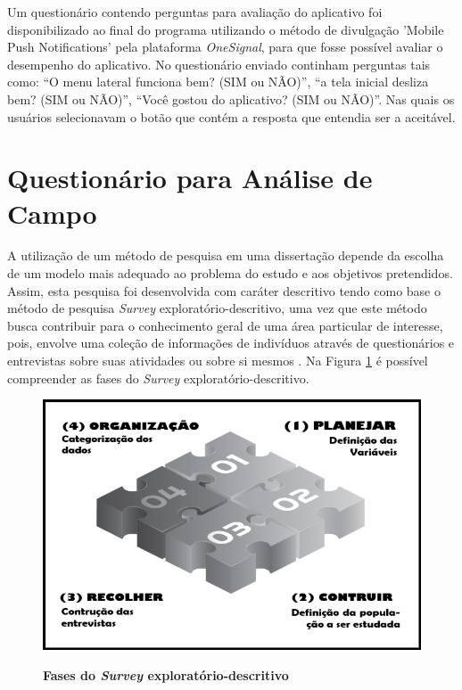 Um questionário contendo perguntas para avaliação do aplicativo foi disponibilizado ao final do programa utilizando o método de divulgação 'Mobile Push Notifications' pela plataforma \textit{OneSignal}, para que fosse possível avaliar o desempenho do aplicativo. No questionário enviado continham perguntas tais como: “O menu lateral funciona bem? (SIM ou NÃO)”, “a tela inicial desliza bem? (SIM ou NÃO)”, “Você gostou do aplicativo? (SIM ou NÃO)”. Nas quais os usuários selecionavam o botão que contém a resposta que entendia ser a aceitável.


\section{Questionário para Análise de Campo}

A utilização de um método de pesquisa em uma dissertação depende da escolha de um modelo mais adequado ao problema do estudo e aos objetivos pretendidos. Assim, esta pesquisa foi desenvolvida com caráter descritivo tendo como base o método de pesquisa \textit{Survey} exploratório-descritivo, uma vez que este método busca contribuir para o conhecimento geral de uma área particular de interesse, pois, envolve uma coleção de informações de indivíduos através de questionários e entrevistas sobre suas atividades ou sobre si mesmos  \cite{forza_survey_2002}. Na Figura \ref{figura_8} é possível compreender as fases do \textit{Survey} exploratório-descritivo.


\begin{figure}[H]
\centering
\caption{\textbf{Fases do \textit{Survey} exploratório-descritivo}}
\includegraphics[scale=0.5]{Imagens/survey.png}
\label{figura_8}
\end{figure}


